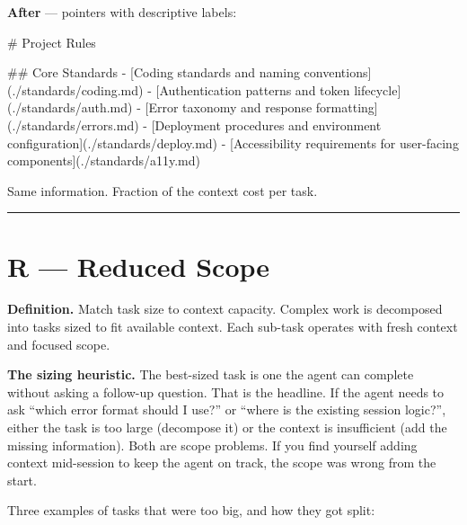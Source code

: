 \documentclass[
  a4paper,
  DIV=11,
  numbers=noendperiod]{scrreprt}
\newenvironment{Shaded}{\begin{snugshade}}{\end{snugshade}}
\newcommand{\CommentTok}[1]{\textcolor[rgb]{0.37,0.37,0.37}{#1}}
\newcommand{\FunctionTok}[1]{\textcolor[rgb]{0.28,0.35,0.67}{#1}}
\newcommand{\OtherTok}[1]{\textcolor[rgb]{0.00,0.23,0.31}{#1}}
\newcommand{\SpecialStringTok}[1]{\textcolor[rgb]{0.13,0.47,0.30}{#1}}
\begin{document}
\textbf{After} --- pointers with descriptive labels:

\begin{Shaded}
\begin{Highlighting}[]
\FunctionTok{\# Project Rules}

\FunctionTok{\#\# Core Standards}
\SpecialStringTok{{-} }\CommentTok{[}\OtherTok{Coding standards and naming conventions}\CommentTok{](./standards/coding.md)}
\SpecialStringTok{{-} }\CommentTok{[}\OtherTok{Authentication patterns and token lifecycle}\CommentTok{](./standards/auth.md)}
\SpecialStringTok{{-} }\CommentTok{[}\OtherTok{Error taxonomy and response formatting}\CommentTok{](./standards/errors.md)}
\SpecialStringTok{{-} }\CommentTok{[}\OtherTok{Deployment procedures and environment configuration}\CommentTok{](./standards/deploy.md)}
\SpecialStringTok{{-} }\CommentTok{[}\OtherTok{Accessibility requirements for user{-}facing components}\CommentTok{](./standards/a11y.md)}
\end{Highlighting}
\end{Shaded}

Same information. Fraction of the context cost per task.

\begin{center}\rule{0.5\linewidth}{0.5pt}\end{center}

\section{R --- Reduced Scope}\label{r-reduced-scope}

\textbf{Definition.} Match task size to context capacity. Complex work
is decomposed into tasks sized to fit available context. Each sub-task
operates with fresh context and focused scope.

\textbf{The sizing heuristic.} The best-sized task is one the agent can
complete without asking a follow-up question. That is the headline. If
the agent needs to ask ``which error format should I use?'' or ``where
is the existing session logic?'', either the task is too large
(decompose it) or the context is insufficient (add the missing
information). Both are scope problems. If you find yourself adding
context mid-session to keep the agent on track, the scope was wrong from
the start.

Three examples of tasks that were too big, and how they got split:
\end{document}
